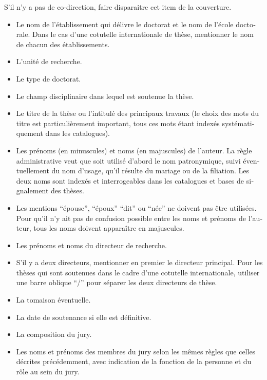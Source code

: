 \begin{otherlanguage}{french}
	S’il n’y a pas de co-direction, faire disparaitre cet item de la couverture.
	
	
	\begin{itemize}
		\item Le nom de l'établissement qui délivre le doctorat et le nom de l’école doctorale.
		Dans le cas d’une cotutelle internationale de thèse, mentionner le nom de chacun des
		établissements.
		\item  L'unité de recherche.
		\item Le type de doctorat.
		\item Le champ disciplinaire dans lequel est soutenue la thèse.
		\item Le titre de la thèse ou l’intitulé des principaux travaux (le choix des mots du titre est	particulièrement important, tous ces mots étant indexés systématiquement dans les catalogues).
		\item Les prénoms (en minuscules) et noms (en majuscules) de l'auteur.
		La règle administrative veut que soit utilisé d'abord le nom patronymique, suivi éventuellement du 	nom d’usage, qu’il résulte du mariage ou de la filiation. Les deux noms sont indexés et interrogeables dans les catalogues et bases de signalement des thèses.
		\item Les mentions \enquote{épouse}, \enquote{époux} \enquote{dit}  ou \enquote{née} ne doivent pas être utilisées. Pour qu'il n'y 	ait pas de confusion possible entre les noms et prénoms de l'auteur, tous les noms doivent apparaître en majuscules.
		\item Les prénoms et noms du directeur de recherche.
		\item S'il y a deux directeurs, mentionner en premier le directeur principal. 
		Pour les thèses qui sont soutenues dans le cadre d'une cotutelle internationale, utiliser une barre oblique \enquote{/} pour séparer les deux directeurs de thèse.
		\item La tomaison éventuelle.
		\item La date de soutenance si elle est définitive.
		\item La composition du jury.
		\item Les noms et prénoms des membres du jury selon les mêmes règles que celles décrites précédemment, avec indication de la fonction de la personne et du rôle au sein du jury. 
	\end{itemize}
	

\end{otherlanguage}
